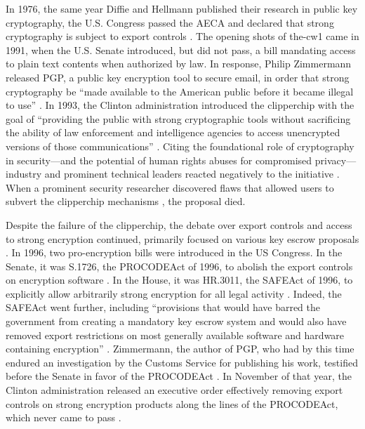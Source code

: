 In 1976, the same year Diffie and Hellmann published their research in public key cryptography, the U.S. Congress passed
the \ac{AECA} and declared that strong cryptography is subject to export controls \cite{kehl_right_2015}. The opening
shots of \ac{the-cw1} came in 1991, when the U.S. Senate introduced, but did not pass, a bill mandating access to plain
text contents when authorized by law. In response, Philip Zimmermann released \ac{PGP}, a public key encryption tool to
secure email, in order that strong cryptography be ``made available to the American public before it became illegal to
use'' \cite{zimmermann_1996}. In 1993, the Clinton administration introduced the \ac{clipperchip} \cite{press_1993} with
the goal of ``providing the public with strong cryptographic tools without sacrificing the ability of law enforcement
and intelligence agencies to access unencrypted versions of those communications'' \cite{thompson_2015}. Citing the
foundational role of cryptography in security---and the potential of human rights abuses for compromised
privacy---industry and prominent technical leaders reacted negatively to the initiative \cite{kehl_right_2015}
\cite{zimmermann_1996}. When a prominent security researcher discovered flaws that allowed users to subvert the
\ac{clipperchip} mechanisms \cite{blaze_protocol_1994}, the proposal died.

Despite the failure of the \ac{clipperchip}, the debate over export controls and access to strong encryption continued,
primarily focused on various key escrow proposals \cite{thompson_2015}. In 1996, two pro-encryption bills were
introduced in the US Congress. In the Senate, it was S.1726, the \ac{PROCODEAct} of 1996, to abolish the export controls
on encryption software \cite{burns_s1726_1996}. In the House, it was HR.3011, the \ac{SAFEAct} of 1996, to explicitly
allow arbitrarily strong encryption for all legal activity \cite{goodlatte_hr3011_1996}. Indeed, the \ac{SAFEAct} went
further, including ``provisions that would have barred the government from creating a mandatory key escrow system and
would also have removed export restrictions on most generally available software and hardware containing encryption''
\cite{kehl_right_2015}. Zimmermann, the author of PGP, who had by this time endured an investigation by the Customs
Service for publishing his work, testified before the Senate in favor of the \ac{PROCODEAct} \cite{zimmermann_1996}. In
November of that year, the Clinton administration released an executive order effectively removing export controls on
strong encryption products along the lines of the \ac{PROCODEAct}, which never came to pass \cite{clinton_1996}.

